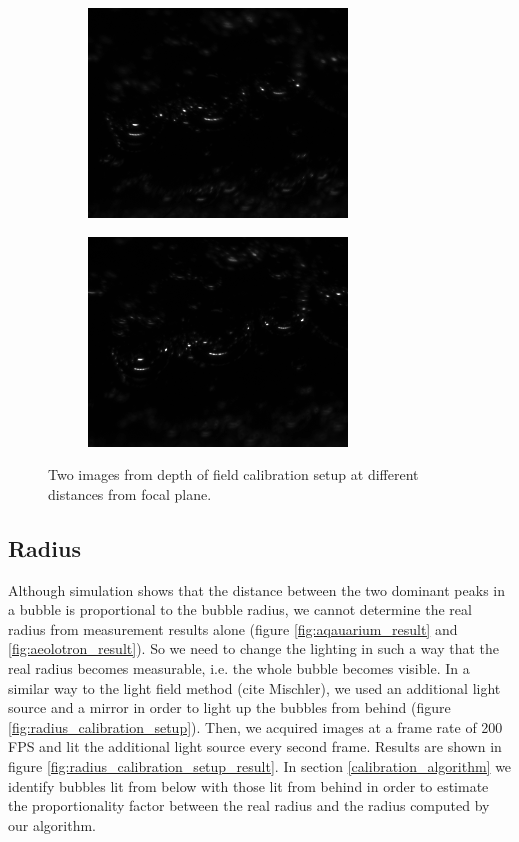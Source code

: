 			\begin{figure}
				\begin{subfigure}[b]{.55\textwidth}
					\centering
					\includegraphics[scale=.5]{images/dof_calib_1.png}
					\caption{}
				\end{subfigure}
				
				\begin{subfigure}[b]{.55\textwidth}
					\centering
					\includegraphics[scale=.5]{images/dof_calib_2.png}
					\caption{}
				\end{subfigure}
				
				\caption{Two images from depth of field calibration setup at different distances from focal plane.}								
				\label{fig:depth_of_field_setup_result}
			\end{figure}
			
			
		\subsection{Radius}\label{sub:radius_setup}
			Although simulation shows that the distance between the two dominant peaks in a bubble is proportional to the bubble radius, we cannot determine the real radius from measurement results alone (figure \ref{fig:aqauarium_result} and \ref{fig:aeolotron_result}). So we need to change the lighting in such a way that the real radius becomes measurable, i.e. the whole bubble becomes visible. In a similar way to the light field method (cite Mischler), we used an additional light source and a mirror in order to light up the bubbles from behind (figure \ref{fig:radius_calibration_setup}). Then, we acquired images at a frame rate of 200 FPS and lit the additional light source every second frame. Results are shown in figure \ref{fig:radius_calibration_setup_result}. In section \ref{calibration_algorithm} we identify bubbles lit from below with those lit from behind in order to estimate the proportionality factor between the real radius and the radius computed by our algorithm. 
			
